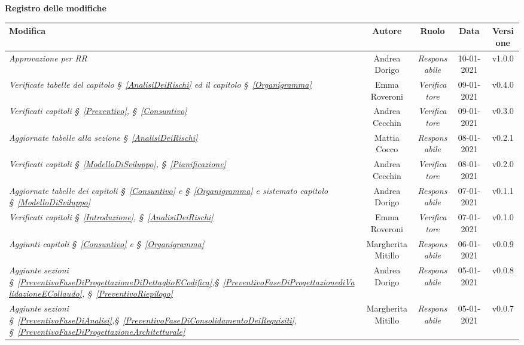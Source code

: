 \quad
\begin{center}
	\LARGE\textbf{Registro delle modifiche}
\end{center}

\def\tabularxcolumn#1{m{#1}}
{

\begin{center}
	\renewcommand{\arraystretch}{1.4}
\begin{tabularx}{\textwidth}{|X|c|c|c|c|}
	\hline
	\rowcolor{airforceblue}
	\textbf{Modifica} & \textbf{Autore} & \textbf{Ruolo} & \textbf{Data} & \textbf{Versione}\\
	\hline
	\textit{Approvazione per RR} & Andrea Dorigo & \textit{Responsabile} & 10-01-2021 & v1.0.0 \\
	\hline
	\textit{Verificate tabelle del capitolo \S~\ref{AnalisiDeiRischi} ed il capitolo \S~\ref{Organigramma}} & Emma Roveroni & \textit{Verificatore} & 09-01-2021 & v0.4.0 \\
	\hline
	\textit{Verificati capitoli \S~\ref{Preventivo}, \S~\ref{Consuntivo} } & Andrea Cecchin & \textit{Verificatore} & 09-01-2021 & v0.3.0 \\
	\hline
	\textit{Aggiornate tabelle alla sezione \S~\ref{AnalisiDeiRischi}} & Mattia Cocco & \textit{Responsabile} & 08-01-2021 & v0.2.1 \\
	\hline
	\textit{Verificati capitoli \S~\ref{ModelloDiSviluppo}, \S~\ref{Pianificazione} } & Andrea Cecchin & \textit{Verificatore} & 08-01-2021 & v0.2.0 \\
	\hline
	\textit{Aggiornate tabelle dei capitoli \S~\ref{Consuntivo} e \S~\ref{Organigramma} e sistemato capitolo \S~\ref{ModelloDiSviluppo}} & Andrea Dorigo & \textit{Responsabile} & 07-01-2021 & v0.1.1 \\
	\hline
	\textit{Verificati capitoli \S~\ref{Introduzione}, \S~\ref{AnalisiDeiRischi} } & Emma Roveroni & \textit{Verificatore} & 07-01-2021 & v0.1.0 \\
	\hline
	\textit{Aggiunti capitoli \S~\ref{Consuntivo} e \S~\ref{Organigramma}} & Margherita Mitillo & \textit{Responsabile} & 06-01-2021 & v0.0.9 \\
	\hline
	\textit{Aggiunte sezioni \S~\ref{PreventivoFaseDiProgettazioneDiDettaglioECodifica},\S~\ref{PreventivoFaseDiProgettazionediValidazioneECollaudo}, \S~\ref{PreventivoRiepilogo} } & Andrea Dorigo & \textit{Responsabile} & 05-01-2021 & v0.0.8 \\
	\hline
	\textit{Aggiunte sezioni \S~\ref{PreventivoFaseDiAnalisi},\S~\ref{PreventivoFaseDiConsolidamentoDeiRequisiti}, \S~\ref{PreventivoFaseDiProgettazioneArchitetturale} } & Margherita Mitillo & \textit{Responsabile} & 05-01-2021 & v0.0.7 \\

\end{tabularx}
\end{center}}
